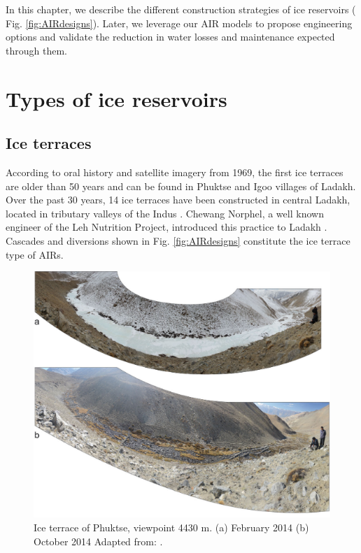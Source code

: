 In this chapter, we describe the different construction strategies of ice reservoirs ( Fig.
\ref{fig:AIRdesigns}). Later, we leverage our AIR models to propose engineering options and validate the
reduction in water losses and maintenance expected through them.


\section{Types of ice reservoirs}

\subsection{Ice terraces}

According to oral history and satellite imagery from 1969, the first ice terraces are older than 50 years and can
be found in Phuktse and Igoo villages of Ladakh. Over the past 30 years, 14 ice terraces have been constructed in central Ladakh,
located in tributary valleys of the Indus \citep{norphelArtificialGlacierHigh2009,
	nusserSociohydrologyArtificialGlaciers2019}. Chewang Norphel, a well known engineer of the Leh Nutrition
Project, introduced this practice to Ladakh \citep{vinceGlacierMan2009}. Cascades and diversions shown in Fig.
\ref{fig:AIRdesigns} constitute the ice terrace type of AIRs.

\begin{figure}[htb]
	\centering
	\includegraphics[width=\textwidth]{figs/IT_example.png}
	\caption{Ice terrace of Phuktse, viewpoint 4430 m. (a) February 2014 (b) October 2014 Adapted from:
		\citet{nusserSociohydrologyArtificialGlaciers2019}.}
	\label{fig:ITexample}
\end{figure}

